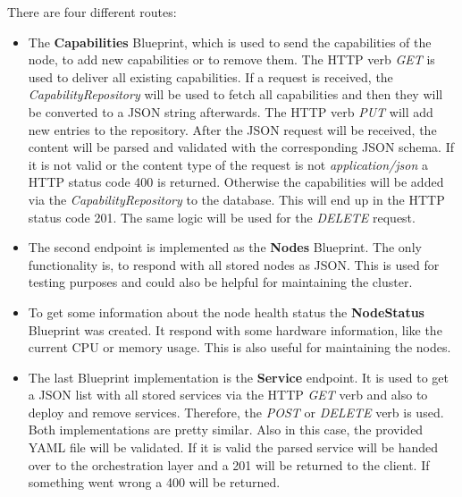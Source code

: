 There are four different routes:
\begin{itemize}
  \item The \textbf{Capabilities} Blueprint, which is used to send the capabilities of the node, to add new capabilities or to remove them.
  The \ac{HTTP} verb \textit{GET} is used to deliver all existing capabilities.
  If a request is received, the \textit{CapabilityRepository} will be used to fetch all capabilities and then they will be converted to a JSON string afterwards.
  The \ac{HTTP} verb \textit{PUT} will add new entries to the repository.
  After the \ac{JSON} request will be received, the content will be parsed and validated with the corresponding \ac{JSON} schema.
  If it is not valid or the content type of the request is not \textit{application/json} a \ac{HTTP} status code 400 is returned.
  Otherwise the capabilities will be added via the \textit{CapabilityRepository} to the database.
  This will end up in the \ac{HTTP} status code 201.
  The same logic will be used for the \textit{DELETE} request.
  \item The second endpoint is implemented as the \textbf{Nodes} Blueprint.
  The only functionality is, to respond with all stored nodes as \ac{JSON}.
  This is used for testing purposes and could also be helpful for maintaining the cluster.
  \item To get some information about the node health status the \textbf{NodeStatus} Blueprint was created.
  It respond with some hardware information, like the current \ac{CPU} or memory usage.
  This is also useful for maintaining the nodes.
  \item The last Blueprint implementation is the \textbf{Service} endpoint.
  It is used to get a \ac{JSON} list with all stored services via the \ac{HTTP} \textit{GET} verb and also to deploy and remove services.
  Therefore, the \textit{POST} or \textit{DELETE} verb is used.
  Both implementations are pretty similar.
  Also in this case, the provided \ac{YAML} file will be validated.
  If it is valid the parsed service will be handed over to the orchestration layer and a 201 will be returned to the client.
  If something went wrong a 400 will be returned.
\end{itemize}

